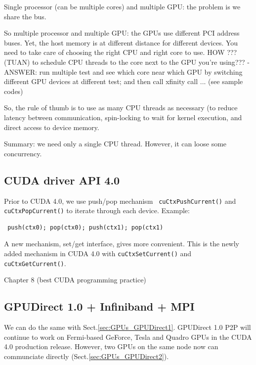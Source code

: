 Single processor (can be multiple cores) and multiple GPU: the problem
is we share the bus.

So multiple processor and multiple GPU: the GPUs use different PCI
address buses. Yet, the host memory is at different distance for
different devices. You need to take care of choosing the right CPU and
right core to use. HOW ??? (TUAN) to schedule CPU threads to the core
next to the GPU you're using??? - ANSWER: run multiple test and see
which core near which GPU by switching different GPU devices at
different test; and then call xfinity call ... (see sample codes)


So, the rule of thumb is to use as many CPU threads as necessary (to
reduce latency between communication, spin-locking to wait for kernel
execution, and direct access to device memory.


Summary: we need only a single CPU thread. However, it can loose some
concurrency. 



\subsection{CUDA driver API 4.0 }
\label{sec:GPUs_driverAPI4.0}

Prior to CUDA 4.0, we use push/pop mechanism \verb! cuCtxPushCurrent()! and 
\verb!cuCtxPopCurrent()! to iterate through each device. Example:
\begin{verbatim}
 push(ctx0); pop(ctx0); push(ctx1); pop(ctx1)
\end{verbatim}

A new mechanism, set/get interface, gives more convenient. This is the newly
added mechanism in CUDA 4.0 with \verb!cuCtxSetCurrent()! and
\verb!cuCtxGetCurrent()!.


Chapter 8 (best CUDA programming practice)





\subsection{GPUDirect 1.0 + Infiniband + MPI}
\label{sec:GPUDirect-v1}

We can do the same with Sect.\ref{sec:GPUs_GPUDirect1}. GPUDirect 1.0 P2P will
continue to work on Fermi-based GeForce, Tesla and Quadro GPUs in the CUDA 4.0
production release. However, two GPUs on the same node now can communciate
directly (Sect.\ref{sec:GPUs_GPUDirect2}).

